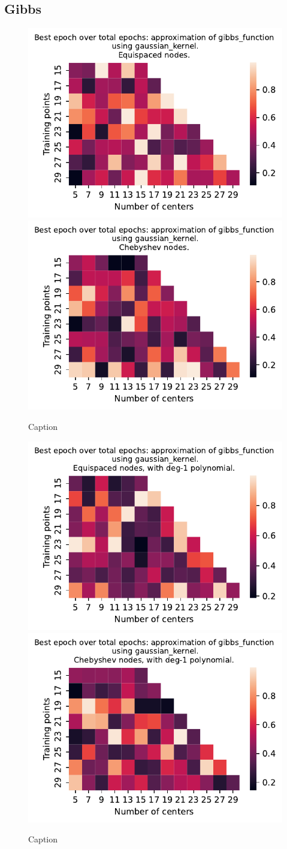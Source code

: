 \documentclass[12pt]{report} %
\begin{document}
\subsection*{Gibbs}

\begin{figure}[ht]
  \centering

  \includegraphics[width=.49\textwidth]{imagenes/experiments/1d/variational_epochs/gibbs_function-Kgaussian_kernel-Equi-epochs.pdf}
  \includegraphics[width=.49\textwidth]{imagenes/experiments/1d/variational_epochs/gibbs_function-Kgaussian_kernel-Cheb-epochs.pdf}
  \caption{Caption}
  \label{fig:epochs-gibbs-gaussian}
\end{figure}



\begin{figure}[ht]
  \centering

  \includegraphics[width=.49\textwidth]{imagenes/experiments/1d/variational_epochs/gibbs_function-Kgaussian_kernel-Poly-Equi-epochs.pdf}
  \includegraphics[width=.49\textwidth]{imagenes/experiments/1d/variational_epochs/gibbs_function-Kgaussian_kernel-Poly-Cheb-epochs.pdf}
  \caption{Caption}
  \label{fig:epochs-gibbs-gaussian-poly}
\end{figure}
\end{document}
